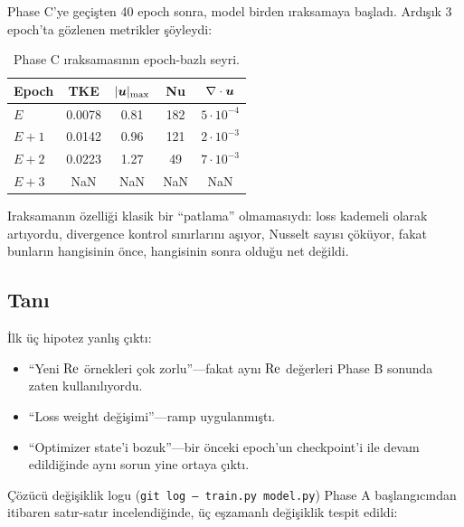 Phase C'ye geçişten 40 epoch sonra, model birden ıraksamaya başladı. Ardışık 3 epoch'ta gözlenen metrikler şöyleydi:

\begin{table}[H]
\centering
\begin{tabular}{lcccc}
\toprule
Epoch & TKE & $|\bm{u}|_{\max}$ & Nu & $\nabla \cdot \bm{u}$ \\
\midrule
$E$        & 0.0078 & 0.81 & 182 & $5\cdot10^{-4}$ \\
$E+1$      & 0.0142 & 0.96 & 121 & $2\cdot10^{-3}$ \\
$E+2$      & 0.0223 & 1.27 &  49 & $7\cdot10^{-3}$ \\
$E+3$      & NaN   & NaN & NaN & NaN \\
\bottomrule
\end{tabular}
\caption{Phase C ıraksamasının epoch-bazlı seyri.}
\end{table}

Iraksamanın özelliği klasik bir ``patlama'' olmamasıydı: loss kademeli olarak artıyordu, divergence kontrol sınırlarını aşıyor, Nusselt sayısı çöküyor, fakat bunların hangisinin önce, hangisinin sonra olduğu net değildi.

\subsection*{Tanı}

İlk üç hipotez yanlış çıktı:
\begin{itemize}
    \item ``Yeni $\mathrm{Re}$ örnekleri çok zorlu''---fakat aynı $\mathrm{Re}$ değerleri Phase B sonunda zaten kullanılıyordu.
    \item ``Loss weight değişimi''---ramp uygulanmıştı.
    \item ``Optimizer state'i bozuk''---bir önceki epoch'un checkpoint'i ile devam edildiğinde aynı sorun yine ortaya çıktı.
\end{itemize}

Çözücü değişiklik logu (\texttt{git log -- train.py model.py}) Phase A başlangıcından itibaren satır-satır incelendiğinde, üç eşzamanlı değişiklik tespit edildi:

